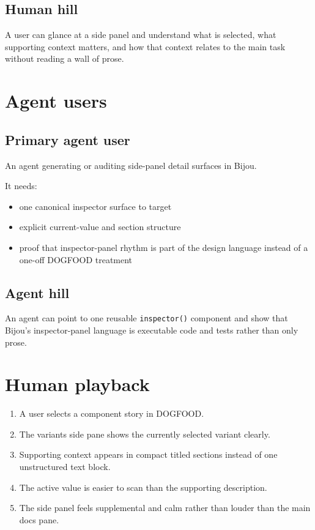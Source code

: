 \subsection{Human hill}\label{record-173-human-hill}

A user can glance at a side panel and understand what is selected, what supporting context matters, and how that context relates to the main task without reading a wall of prose.

\section{Agent users}\label{record-173-agent-users}

\subsection{Primary agent user}\label{record-173-primary-agent-user}

An agent generating or auditing side-panel detail surfaces in Bijou.

It needs:

\begin{itemize}
\tightlist
\item
  one canonical inspector surface to target
\item
  explicit current-value and section structure
\item
  proof that inspector-panel rhythm is part of the design language instead of a one-off DOGFOOD treatment
\end{itemize}

\subsection{Agent hill}\label{record-173-agent-hill}

An agent can point to one reusable \texttt{i\allowbreak{}n\allowbreak{}s\allowbreak{}p\allowbreak{}e\allowbreak{}c\allowbreak{}t\allowbreak{}o\allowbreak{}r\allowbreak{}(\allowbreak{})} component and show that Bijou's inspector-panel language is executable code and tests rather than only prose.

\section{Human playback}\label{record-173-human-playback}

\begin{enumerate}
\def\labelenumi{\arabic{enumi}.}
\tightlist
\item
  A user selects a component story in DOGFOOD.
\item
  The variants side pane shows the currently selected variant clearly.
\item
  Supporting context appears in compact titled sections instead of one unstructured text block.
\item
  The active value is easier to scan than the supporting description.
\item
  The side panel feels supplemental and calm rather than louder than the main docs pane.
\end{enumerate}

